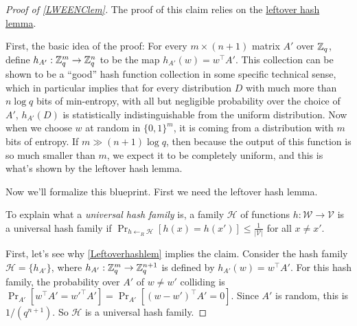 \begin{proof}[Proof of \cref{LWEENClem}]
The proof of this claim relies on the
\href{https://goo.gl/KXpccP}{leftover hash lemma}.

First, the basic idea of the proof: For every \(m\times (n+1)\) matrix
\(A'\) over \({\mathbb{Z}}_q\), define \(h_{A'}:{\mathbb{Z}}_q^m \rightarrow {\mathbb{Z}}_q^n\) to be
the map \(h_{A'}(w)=w^\top A'\). This collection can be shown to be a
``good'' hash function collection in some specific technical sense,
which in particular implies that for every distribution \(D\) with much
more than \(n\log q\) bits of min-entropy, with all but negligible
probability over the choice of \(A'\), \(h_{A'}(D)\) is statistically
indistinguishable from the uniform distribution. Now when we choose
\(w\) at random in \(\{0,1\}^m\), it is coming from a distribution with
\(m\) bits of entropy. If \(m \gg (n+1)\log q\), then because the output
of this function is so much smaller than \(m\), we expect it to be
completely uniform, and this is what's shown by the leftover hash lemma.

Now we'll formalize this blueprint. First we need the leftover hash
lemma.

\hypertarget{Leftoverhashlem}{}

To explain what a \emph{universal hash family} is, a family
\(\mathcal{H}\) of functions \(h:\mathcal{W}\to\mathcal{V}\) is a
universal hash family if
\(\Pr_{h\gets_R\mathcal{H}}[h(x)=h(x')]\le\frac{1}{|\mathcal{V}|}\) for
all \(x\neq x'\).

First, let's see why \cref{Leftoverhashlem} implies the claim. Consider
the hash family \(\mathcal{H}=\{h_{A'}\}\), where
\(h_{A'}:{\mathbb{Z}}_q^m \rightarrow {\mathbb{Z}}_q^{n+1}\) is defined by
\(h_{A'}(w)=w^\top A'\). For this hash family, the probability over
\(A'\) of \(w\neq w'\) colliding is
\(\Pr_{A'}[w^\top A'=w'^\top A']=\Pr_{A'}[(w-w')^\top A'=0]\). Since
\(A'\) is random, this is \(1/(q^{n+1})\). So \(\mathcal{H}\) is a
universal hash family.


\end{proof}
